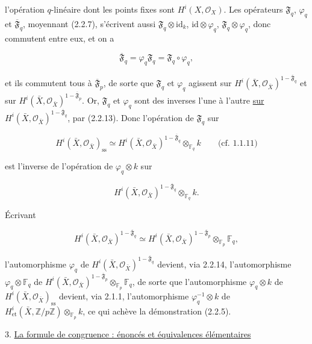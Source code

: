 l'opération $q$-linéaire dont les points fixes sont $H^i(X,\mathcal O_X)$.
Les opérateurs $\mathfrak F_q$, $\varphi_q$ et
$\overline{\mathfrak F}_q$, moyennant (2.2.7), s'écrivent aussi
$\mathfrak F_q\otimes\mathrm{id}_k$, $\mathrm{id}\otimes\varphi_q$,
$\mathfrak F_q\otimes\varphi_q$, donc commutent entre eux, et on a

\begin{equation}\tag{2.2.13}
\overline{\mathfrak F}_q
=\varphi_q\mathfrak F_q
=\mathfrak F_q\circ\varphi_q,
\end{equation}

et ils commutent tous à $\overline{\mathfrak F}_p$, de sorte que $\mathfrak F_q$ et
$\varphi_q$ agissent sur
$H^i(\bar X,\mathcal O_{\bar X})^{1-\overline{\mathfrak F}_q}$ et sur
$H^i(\bar X,\mathcal O_{\bar X})^{1-\overline{\mathfrak F}_p}$. Or,
$\mathfrak F_q$ et $\varphi_q$ sont des inverses l'une à l'autre \underline{sur}
$H^i(\bar X,\mathcal O_{\bar X})^{1-\overline{\mathfrak F}_q}$, par (2.2.13).
Donc l'opération de $\mathfrak F_q$ sur

\[
H^i(\bar X,\mathcal O_{\bar X})_{\mathrm{ss}}
\simeq H^i(\bar X,\mathcal O_{\bar X})^{1-\overline{\mathfrak F}_q}
\otimes_{\mathbb F_q}k
\qquad\text{(cf. 1.1.11)}
\]

est l'inverse de l'opération de $\varphi_q\otimes k$ sur

\[
H^i(\bar X,\mathcal O_{\bar X})^{1-\overline{\mathfrak F}_q}
\otimes_{\mathbb F_q}k.
\]

Écrivant

\begin{equation}\tag{2.2.14}
H^i(\bar X,\mathcal O_{\bar X})^{1-\overline{\mathfrak F}_q}
\simeq
H^i(\bar X,\mathcal O_{\bar X})^{1-\overline{\mathfrak F}_p}
\otimes_{\mathbb F_p}\mathbb F_q,
\end{equation}

l'automorphisme $\varphi_q$ de
$H^i(\bar X,\mathcal O_{\bar X})^{1-\overline{\mathfrak F}_q}$ devient, via
2.2.14, l'automorphisme $\varphi_q\otimes\mathbb F_q$ de
$H^i(\bar X,\mathcal O_{\bar X})^{1-\overline{\mathfrak F}_p}
\otimes_{\mathbb F_p}\mathbb F_q$, de sorte que l'automorphisme
$\varphi_q\otimes k$ de $H^i(\bar X,\mathcal O_{\bar X})_{\mathrm{ss}}$
devient, via 2.1.1, l'automorphisme $\varphi_q^{-1}\otimes k$ de
$H^i_{\mathrm{et}}(\bar X,\mathbb Z/p\mathbb Z)\otimes_{\mathbb F_p}k$,
ce qui achève la démonstration (2.2.5).


3. \underline{La formule de congruence : énoncés et équivalences élémentaires}

